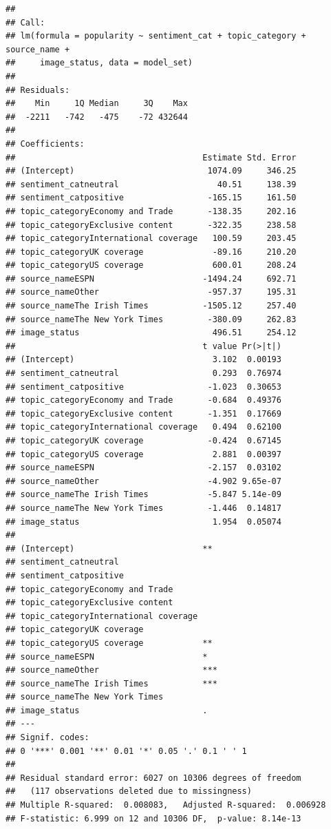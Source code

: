 \documentclass[
]{article}
\begin{document}
\begin{verbatim}
## 
## Call:
## lm(formula = popularity ~ sentiment_cat + topic_category + source_name + 
##     image_status, data = model_set)
## 
## Residuals:
##    Min     1Q Median     3Q    Max 
##  -2211   -742   -475    -72 432644 
## 
## Coefficients:
##                                      Estimate Std. Error
## (Intercept)                           1074.09     346.25
## sentiment_catneutral                    40.51     138.39
## sentiment_catpositive                 -165.15     161.50
## topic_categoryEconomy and Trade       -138.35     202.16
## topic_categoryExclusive content       -322.35     238.58
## topic_categoryInternational coverage   100.59     203.45
## topic_categoryUK coverage              -89.16     210.20
## topic_categoryUS coverage              600.01     208.24
## source_nameESPN                      -1494.24     692.71
## source_nameOther                      -957.37     195.31
## source_nameThe Irish Times           -1505.12     257.40
## source_nameThe New York Times         -380.09     262.83
## image_status                           496.51     254.12
##                                      t value Pr(>|t|)
## (Intercept)                            3.102  0.00193
## sentiment_catneutral                   0.293  0.76974
## sentiment_catpositive                 -1.023  0.30653
## topic_categoryEconomy and Trade       -0.684  0.49376
## topic_categoryExclusive content       -1.351  0.17669
## topic_categoryInternational coverage   0.494  0.62100
## topic_categoryUK coverage             -0.424  0.67145
## topic_categoryUS coverage              2.881  0.00397
## source_nameESPN                       -2.157  0.03102
## source_nameOther                      -4.902 9.65e-07
## source_nameThe Irish Times            -5.847 5.14e-09
## source_nameThe New York Times         -1.446  0.14817
## image_status                           1.954  0.05074
##                                         
## (Intercept)                          ** 
## sentiment_catneutral                    
## sentiment_catpositive                   
## topic_categoryEconomy and Trade         
## topic_categoryExclusive content         
## topic_categoryInternational coverage    
## topic_categoryUK coverage               
## topic_categoryUS coverage            ** 
## source_nameESPN                      *  
## source_nameOther                     ***
## source_nameThe Irish Times           ***
## source_nameThe New York Times           
## image_status                         .  
## ---
## Signif. codes:  
## 0 '***' 0.001 '**' 0.01 '*' 0.05 '.' 0.1 ' ' 1
## 
## Residual standard error: 6027 on 10306 degrees of freedom
##   (117 observations deleted due to missingness)
## Multiple R-squared:  0.008083,   Adjusted R-squared:  0.006928 
## F-statistic: 6.999 on 12 and 10306 DF,  p-value: 8.14e-13
\end{verbatim}
\end{document}
